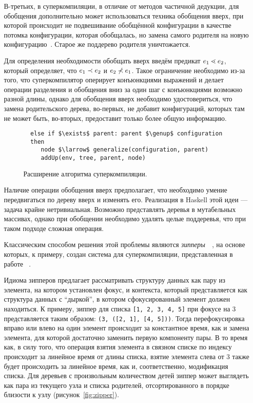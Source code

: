 
В-третьих, в суперкомпиляции, в отличие от методов частичной дедукции, для обобщения дополнительно может использоваться
техника обобщения вверх, при которой происходит не подвешивание обобщённой конфигурации
в качестве потомка конфигурации, которая обобщалась, но замена самого родителя на
новую конфигурацию~\cite{scPos}. Старое же поддерево родителя уничтожается.

Для определения необходимости обобщать вверх введём предикат $e_1 \lessdot e_2$,
который определяет, что $e_1 \prec e_2$ и $e_2 \not\prec e_1$.
Такое ограничение необходимо из-за того, что суперкомпилятор оперирует
конъюнкциями выражений и делает операции разделения и обобщения вниз
за один шаг с конъюнкциями возможно разной длины, однако для обобщения
вверх необходимо удостовериться, что замена родительского дерева, во-первых,
не добавит конфигураций, которых там не может быть, во-вторых, предоставит
только более общую информацию.

\begin{figure}[h!]
\begin{lstlisting}
  else if $\exists$ parent: parent $\genup$ configuration
  then
     node $\larrow$ generalize(configuration, parent)
     addUp(env, tree, parent, node)
\end{lstlisting}
\caption{Расширение алгоритма суперкомпиляции.}
\label{fig:scalgogenExtended}
\end{figure}

Наличие операции обобщения вверх предполагает, что необходимо умение передвигаться по дереву вверх и изменять его.
Реализация в Haskell этой идеи --- задача крайне нетривиальная. Возможно представлять
деревья в мутабельных массивах, однако при обобщении необходимо удалять целые поддеревья,
что при таком подходе сложная операция.

Классическим способом решения этой проблемы являются \emph{зипперы}~~\cite{zipper},
на основе которых, к примеру, создан система для суперкомпиляции,
представленная в работе ~\cite{optimus}.

Идиома зипперов предлагает рассматривать структуру данных как пару из элемента,
на котором установлен фокус, и контекста, который представляется как структура данных
с ``дыркой'', в котором сфокусированный элемент должен находиться.
К примеру, зиппер для списка \lstinline{[1, 2, 3, 4, 5]} при фокусе на 3 представляется
таким образом: \lstinline{(3, ([2, 1], [4, 5]))}.
Тогда перефокусировка вправо или влево на один элемент происходит за константное время,
как и замена элемента, для которой достаточно заменить первую компоненту пары.
В то время как, в силу того, что операция взятия элемента в связном списке по индексу
происходит за линейное время от длины списка, взятие элемента слева от 3 также
будет происходить за линейное время, как и, соответственно, модификация списка.
Для деревьев с произвольным количеством детей зиппер может выглядеть
как пара из текущего узла и списка родителей, отсортированного в порядке
близости к узлу (рисунок~\ref{fig:zipper}).

